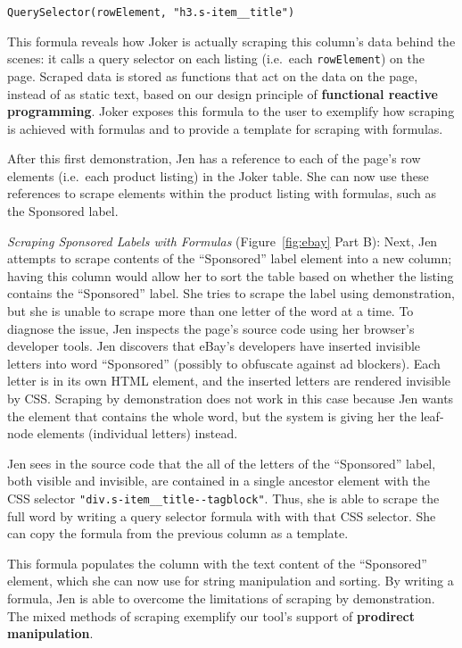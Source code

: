\documentclass[sigconf,10pt]{acmart}
\begin{document}
\texttt{QuerySelector(rowElement,\ "h3.s-item\_\_title")}

This formula reveals how Joker is actually scraping this column's data
behind the scenes: it calls a query selector on each listing (i.e.~each
\texttt{rowElement}) on the page. Scraped data is stored as functions
that act on the data on the page, instead of as static text, based on
our design principle of \textbf{functional reactive programming}. Joker
exposes this formula to the user to exemplify how scraping is achieved
with formulas and to provide a template for scraping with formulas.

After this first demonstration, Jen has a reference to each of the
page's row elements (i.e.~each product listing) in the Joker table. She
can now use these references to scrape elements within the product
listing with formulas, such as the Sponsored label.

\emph{Scraping Sponsored Labels with Formulas} (Figure~\ref{fig:ebay}
Part B): Next, Jen attempts to scrape contents of the ``Sponsored''
label element into a new column; having this column would allow her to
sort the table based on whether the listing contains the ``Sponsored''
label. She tries to scrape the label using demonstration, but she is
unable to scrape more than one letter of the word at a time. To diagnose
the issue, Jen inspects the page's source code using her browser's
developer tools. Jen discovers that eBay's developers have inserted
invisible letters into word ``Sponsored'' (possibly to obfuscate against
ad blockers). Each letter is in its own HTML element, and the inserted
letters are rendered invisible by CSS. Scraping by demonstration does
not work in this case because Jen wants the element that contains the
whole word, but the system is giving her the leaf-node elements
(individual letters) instead.

Jen sees in the source code that the all of the letters of the
``Sponsored'' label, both visible and invisible, are contained in a
single ancestor element with the CSS selector
\texttt{"div.s-item\_\_title-\/-tagblock"}. Thus, she is able to scrape
the full word by writing a query selector formula with with that CSS
selector. She can copy the formula from the previous column as a
template.

This formula populates the column with the text content of the
``Sponsored'' element, which she can now use for string manipulation and
sorting. By writing a formula, Jen is able to overcome the limitations
of scraping by demonstration. The mixed methods of scraping exemplify
our tool's support of \textbf{prodirect manipulation}.
\end{document}
